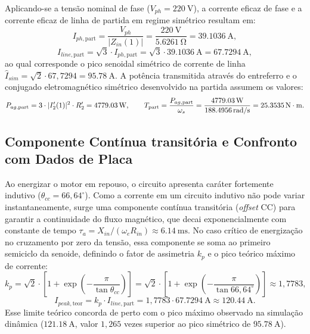 Aplicando-se a tensão nominal de fase ($V_{ph} = \SI{220}{\volt}$), a corrente eficaz de fase e a corrente eficaz de linha de partida em regime simétrico resultam em:
\begin{equation}
I_{ph,\text{part}} = \frac{V_{ph}}{|Z_{in}(1)|} = \frac{\SI{220}{\volt}}{\SI{5,6261}{\ohm}} = \SI{39,1036}{\ampere},
\label{eq:iph_bloqueado}
\end{equation}
\begin{equation}
I_{line,\text{part}} = \sqrt{3} \cdot I_{ph,\text{part}} = \sqrt{3} \cdot \SI{39,1036}{\ampere} = \SI{67,7294}{\ampere},
\label{eq:iline_bloqueado}
\end{equation}
ao qual corresponde o pico senoidal simétrico de corrente de linha $\hat{I}_{sim} = \sqrt{2} \cdot 67{,}7294 = \SI{95,78}{\ampere}$. A potência transmitida através do entreferro e o conjugado eletromagnético simétrico desenvolvido na partida assumem os valores:
\begin{equation}
P_{ag,\text{part}} = 3 \cdot |I_2'(1)|^2 \cdot R_2' = \SI{4779,03}{\watt}, \qquad T_{\text{part}} = \frac{P_{ag,\text{part}}}{\omega_s} = \frac{\SI{4779,03}{\watt}}{\SI{188,4956}{\mathrm{rad/s}}} = \SI{25,3535}{\mathrm{N\cdot m}}.
\label{eq:conjugado_partida_s1}
\end{equation}

\subsection{Componente Contínua transitória e Confronto com Dados de Placa}\label{subsec:inrush_placa}

Ao energizar o motor em repouso, o circuito apresenta caráter fortemente indutivo ($\theta_{cc} = 66{,}64^\circ$). Como a corrente em um circuito indutivo não pode variar instantaneamente, surge uma componente contínua transitória (\textit{offset} CC) para garantir a continuidade do fluxo magnético, que decai exponencialmente com constante de tempo $\tau_a = X_{in}/(\omega_e R_{in}) \approx \SI{6,14}{\milli\second}$. No caso crítico de energização no cruzamento por zero da tensão, essa componente se soma ao primeiro semiciclo da senoide, definindo o fator de assimetria $k_p$ e o pico teórico máximo de corrente:
\begin{equation}
k_p = \sqrt{2} \cdot \left[ 1 + \exp\left(-\frac{\pi}{\tan \theta_{cc}}\right) \right] = \sqrt{2} \cdot \left[ 1 + \exp\left(-\frac{\pi}{\tan 66{,}64^\circ}\right) \right] \approx 1{,}7783,
\label{eq:fator_kp}
\end{equation}
\begin{equation}
I_{peak,\text{teor}} = k_p \cdot I_{line,\text{part}} = 1{,}7783 \cdot \SI{67,7294}{\ampere} \approx \SI{120,44}{\ampere}.
\label{eq:inrush_teorico}
\end{equation}
Esse limite teórico concorda de perto com o pico máximo observado na simulação dinâmica ($\SI{121,18}{\ampere}$, valor $1{,}265$ vezes superior ao pico simétrico de $\SI{95,78}{\ampere}$).

